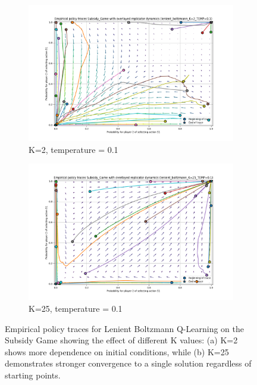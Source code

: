 \documentclass[12pt,a4paper, onecolumn]{exam}
\begin{document}
\begin{figure}[h]
    \centering
    \begin{subfigure}{0.49\textwidth}
        \centering
        \includegraphics[width=\linewidth]{plots/replicator_trajectoreis_Subsidy_Game_lenient_boltzmann_K=2_TEMP=0.1.png}
        \caption{K=2, temperature = 0.1}
        \label{fig:sfiglbshk1}
    \end{subfigure}
    \hfill
    \begin{subfigure}{0.49\textwidth}
        \centering
        \includegraphics[width=\linewidth]{plots/replicator_trajectoreis_Subsidy_Game_lenient_boltzmann_K=25_TEMP=0.1.png}
        \caption{K=25, temperature = 0.1}
        \label{fig:sfiglbshk2}
    \end{subfigure}
    \caption{Empirical policy traces for Lenient Boltzmann Q-Learning on the Subsidy Game showing the effect of different K values: (a) K=2 shows more dependence on initial conditions, while (b) K=25 demonstrates stronger convergence to a single solution regardless of starting points.}
    \label{fig:combined_subsidy}
\end{figure}
\end{document}
